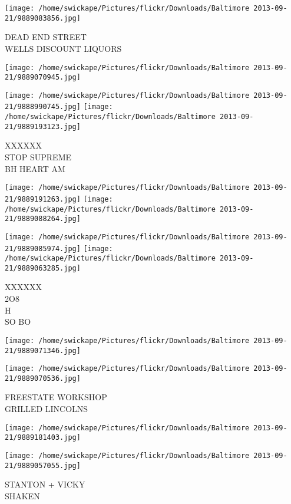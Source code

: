 \documentclass[10pt,letterpaper]{article}
\begin{document}
\vspace{0.25in}
\texttt{[image: /home/swickape/Pictures/flickr/Downloads/Baltimore 2013-09-21/9889083856.jpg]}

DEAD END STREET\\
WELLS DISCOUNT LIQUORS
\pagebreak

\texttt{[image: /home/swickape/Pictures/flickr/Downloads/Baltimore 2013-09-21/9889070945.jpg]}

\vspace{0.25in}
\texttt{[image: /home/swickape/Pictures/flickr/Downloads/Baltimore 2013-09-21/9888990745.jpg]}
\texttt{[image: /home/swickape/Pictures/flickr/Downloads/Baltimore 2013-09-21/9889193123.jpg]}

XXXXXX\\
STOP SUPREME\\
BH HEART AM
\pagebreak

\texttt{[image: /home/swickape/Pictures/flickr/Downloads/Baltimore 2013-09-21/9889191263.jpg]}
\texttt{[image: /home/swickape/Pictures/flickr/Downloads/Baltimore 2013-09-21/9889088264.jpg]}

\texttt{[image: /home/swickape/Pictures/flickr/Downloads/Baltimore 2013-09-21/9889085974.jpg]}
\texttt{[image: /home/swickape/Pictures/flickr/Downloads/Baltimore 2013-09-21/9889063285.jpg]}

XXXXXX\\
2O8\\
H\\
SO BO
\pagebreak

\texttt{[image: /home/swickape/Pictures/flickr/Downloads/Baltimore 2013-09-21/9889071346.jpg]}

\vspace{0.25in}
\texttt{[image: /home/swickape/Pictures/flickr/Downloads/Baltimore 2013-09-21/9889070536.jpg]}

FREESTATE WORKSHOP\\
GRILLED LINCOLNS
\pagebreak

\texttt{[image: /home/swickape/Pictures/flickr/Downloads/Baltimore 2013-09-21/9889181403.jpg]}

\vspace{0.25in}
\texttt{[image: /home/swickape/Pictures/flickr/Downloads/Baltimore 2013-09-21/9889057055.jpg]}

STANTON + VICKY\\
SHAKEN
\pagebreak
\end{document}
